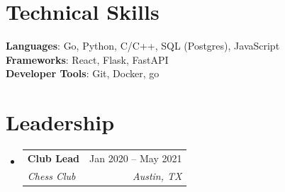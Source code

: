 \documentclass[letterpaper,11pt]{article}
\makeatletter
\newcommand{\resumeSubheading}[4]{\vspace{-2pt}\item
    \begin{tabular*}{0.97\textwidth}[t]{l@{\extracolsep{\fill}}r}
      \textbf{#1} & #2 \\
      \textit{\small#3} & \textit{\small #4} \\
    \end{tabular*}\vspace{-7pt}}
\newcommand{\resumeSubHeadingListStart}{\begin{itemize}[leftmargin=0.15in, label={}]}
\newcommand{\resumeSubHeadingListEnd}{\end{itemize}}
\makeatother
\begin{document}
\section{Technical Skills}
 \begin{itemize}[leftmargin=0.15in, label={}]
    \small{\item{
     \textbf{Languages}{: Go, Python, C/C++, SQL (Postgres), JavaScript} \\
     \textbf{Frameworks}{: React, Flask, FastAPI} \\
     \textbf{Developer Tools}{: Git, Docker, go} \\
    }}
 \end{itemize}

\section{Leadership}
  \resumeSubHeadingListStart
    \resumeSubheading{Club Lead}{Jan 2020 -- May 2021}{Chess Club}{Austin, TX}
  \resumeSubHeadingListEnd
\end{document}
